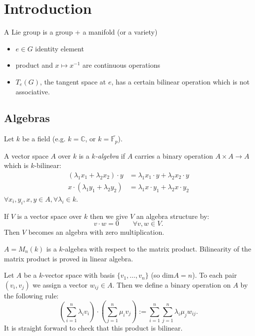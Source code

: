 \section{Introduction}

A Lie group is a group + a manifold (or a variety)
\begin{itemize}
  \item $e \in G$ identity element
  \item product and $x \mapsto x^{-1}$ are continuous operations
  \item $T_e(G)$, the tangent space at $e$, has a certain bilinear operation which is not associative.
\end{itemize}

\subsection{Algebras}

Let $k$ be a field (e.g. $k=\mathbb{C}$, or $k=\bar{\mathbb{F}_p}$).

\begin{definition}
  A vector space $A$ over $k$ is a \emph{$k$-algebra} if $A$ carries a binary operation $A \times A \to A$ which is $k$-bilinear:
  \begin{align*}
    (\lambda_1 x_1 + \lambda_2 x_2) \cdot y &= \lambda_1 x_1 \cdot y + \lambda_2 x_2 \cdot y\\
    x \cdot (\lambda_1 y_1 + \lambda_2 y_2) &= \lambda_1 x \cdot y_1 + \lambda_2 x \cdot  y_2
  \end{align*}
  $\forall x_i, y_i, x, y \in A, \forall \lambda_i \in k$.
\end{definition}

\begin{example}
  If $V$ is a vector space over $k$ then we give $V$ an algebra structure by:
  \[
    v \cdot w = 0 \qquad \forall v,w \in V.
  \]
  Then $V$ becomes an algebra with zero multiplication.
\end{example}

\begin{example}
  $A=M_n(k)$ is a $k$-algebra with respect to the matrix product. Bilinearity of the matrix product is proved in linear algebra.
\end{example}

\begin{remark}
  Let $A$ be a $k$-vector space with basis $\{v_1, \dots, v_n\}$ (so $\text{dim} A = n$). To each pair $(v_i,v_j)$ we assign a vector $w_{ij} \in A$. Then we define a binary operation on $A$ by the following rule:
  \[
    \left( \sum_{i=1}^n \lambda_i v_i \right) \cdot \left( \sum_{j=1}^n \mu_i v_j \right) := \sum_{i=1}^n \sum_{j=1}^n \lambda_i \mu_j w_{ij}.
  \]
  It is straight forward to check that this product is bilinear.
\end{remark}

